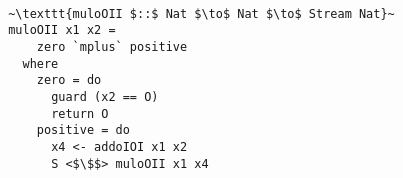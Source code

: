\begin{figure}[!t]
  \centering
  \begin{minipage}{\columnwidth}
    \begin{lstlisting}[]

 ~\texttt{muloOII $::$ Nat $\to$ Nat $\to$ Stream Nat}~
 muloOII x1 x2 =
     zero `mplus` positive
   where
     zero = do
       guard (x2 == O)
       return O
     positive = do
       x4 <- addoIOI x1 x2
       S <$\$$> muloOII x1 x4
    \end{lstlisting}
  \end{minipage}
\end{figure}
